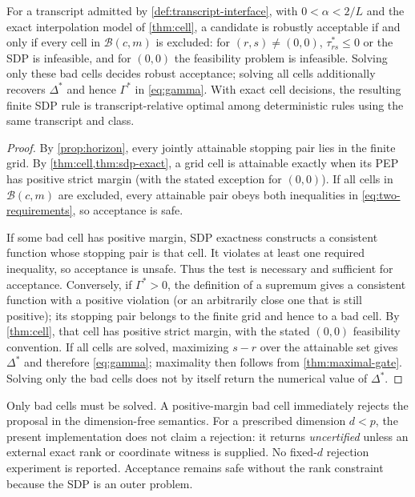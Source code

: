\documentclass[smallextended]{svjour3}
\begin{document}
\begin{theorem}
\label{thm:finite-gate}
For a transcript admitted by \cref{def:transcript-interface}, with
$0<\alpha<2/L$ and the exact interpolation model of \cref{thm:cell}, a
candidate is robustly acceptable if and only if
every cell in $\mathcal B(c,m)$ is excluded: for $(r,s)\neq(0,0)$,
$\tau_{rs}^*\leq0$ or the SDP is infeasible, and for $(0,0)$ the feasibility
problem is infeasible.  Solving only these bad cells decides robust acceptance;
solving all cells additionally recovers $\Delta^*$ and hence $\Gamma^*$ in
\eqref{eq:gamma}.  With exact cell decisions, the resulting finite SDP rule is
transcript-relative optimal among deterministic rules using the same
transcript and class.
\end{theorem}

\begin{proof}
By \cref{prop:horizon}, every jointly attainable stopping pair lies in the
finite grid.  By \cref{thm:cell,thm:sdp-exact}, a grid cell is attainable
exactly when its PEP has positive strict margin (with the stated exception for
$(0,0)$).  If all cells in $\mathcal B(c,m)$ are excluded, every attainable
pair obeys both inequalities in \eqref{eq:two-requirements}, so acceptance is
safe.

If some bad cell has positive margin, SDP exactness constructs a consistent
function whose stopping pair is that cell.  It violates at least one required
inequality, so acceptance is unsafe.  Thus the test is necessary and
sufficient for acceptance.  Conversely, if $\Gamma^*>0$, the definition of a
supremum gives a consistent function with a positive violation (or an
arbitrarily close one that is still positive); its stopping pair belongs to
the finite grid and hence to a bad cell.  By \cref{thm:cell}, that cell has
positive strict margin, with the stated $(0,0)$ feasibility convention.  If
all cells are solved, maximizing $s-r$ over
the attainable set gives $\Delta^*$ and therefore \eqref{eq:gamma}; maximality
then follows from \cref{thm:maximal-gate}.  Solving only the bad cells does not
by itself return the numerical value of $\Delta^*$.
\end{proof}

Only bad cells must be solved.  A positive-margin bad cell immediately rejects
the proposal in the dimension-free semantics.  For a prescribed dimension
$d<p$, the present implementation does not claim a rejection: it returns
\emph{uncertified} unless an external exact rank or coordinate witness is
supplied.  No fixed-$d$ rejection experiment is reported.  Acceptance remains
safe without the rank constraint because the SDP is an outer problem.
\end{document}
